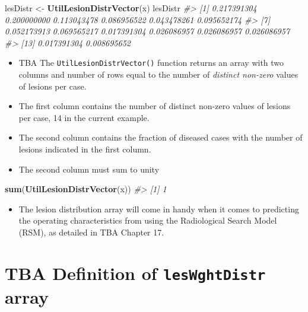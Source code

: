 \documentclass[
]{book}
\newenvironment{Shaded}{\begin{snugshade}}{\end{snugshade}}
\newcommand{\CommentTok}[1]{\textcolor[rgb]{0.56,0.35,0.01}{\textit{#1}}}
\newcommand{\KeywordTok}[1]{\textcolor[rgb]{0.13,0.29,0.53}{\textbf{#1}}}
\newcommand{\NormalTok}[1]{#1}
\newcommand{\StringTok}[1]{\textcolor[rgb]{0.31,0.60,0.02}{#1}}
\providecommand{\tightlist}{%
  \setlength{\itemsep}{0pt}\setlength{\parskip}{0pt}}
\begin{document}
\begin{Shaded}
\begin{Highlighting}[]
\NormalTok{lesDistr <-}\StringTok{ }\KeywordTok{UtilLesionDistrVector}\NormalTok{(x)}
\NormalTok{lesDistr}
\CommentTok{#>  [1] 0.217391304 0.200000000 0.113043478 0.086956522 0.043478261 0.095652174}
\CommentTok{#>  [7] 0.052173913 0.069565217 0.017391304 0.026086957 0.026086957 0.026086957}
\CommentTok{#> [13] 0.017391304 0.008695652}
\end{Highlighting}
\end{Shaded}

\begin{itemize}
\tightlist
\item
  TBA The \texttt{UtilLesionDistrVector()} function returns an array with two columns and number of rows equal to the number of \emph{distinct non-zero} values of lesions per case.
\item
  The first column contains the number of distinct non-zero values of lesions per case, 14 in the current example.
\item
  The second column contains the fraction of diseased cases with the number of lesions indicated in the first column.
\item
  The second column must sum to unity
\end{itemize}

\begin{Shaded}
\begin{Highlighting}[]
\KeywordTok{sum}\NormalTok{(}\KeywordTok{UtilLesionDistrVector}\NormalTok{(x))}
\CommentTok{#> [1] 1}
\end{Highlighting}
\end{Shaded}

\begin{itemize}
\tightlist
\item
  The lesion distribution array will come in handy when it comes to predicting the operating characteristics from using the Radiological Search Model (RSM), as detailed in TBA Chapter 17.
\end{itemize}

\hypertarget{quick-start-froc-data-lesion-weights}{%
\section{\texorpdfstring{TBA Definition of \texttt{lesWghtDistr} array}{TBA Definition of lesWghtDistr array}}\label{quick-start-froc-data-lesion-weights}}
\end{document}
